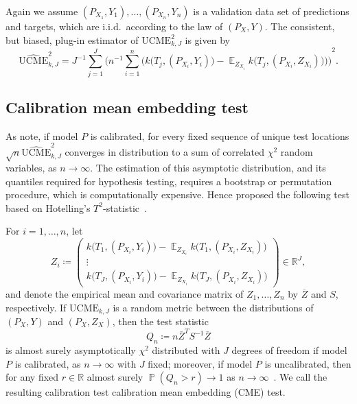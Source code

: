 \documentclass{article}
\DeclareMathOperator{\Prob}{\mathbb{P}}
\DeclareMathOperator{\Exp}{\mathbb{E}}
\begin{document}
Again we assume $(P_{X_1}, Y_1), \ldots, (P_{X_n}, Y_n)$ is a 
validation data set of predictions and targets, which are i.i.d.\
according to the law of $(P_X, Y)$. The consistent, but biased,
plug-in estimator of $\mathrm{UCME}^2_{k,J}$ is given by
\begin{equation*}
     \widehat{\mathrm{UCME}}^2_{k,J} = {J}^{-1} \sum_{j=1}^J {\Bigg(n^{-1} \sum_{i=1}^n \Big( k\big(T_j, (P_{X_i}, Y_i)\big) - \Exp_{Z_{X_i}} k\big(T_j, (P_{X_i}, Z_{X_i})\big)\Big) \Bigg)}^2.
\end{equation*}

\subsection{Calibration mean embedding test}

As \citet{Chwialkowski2015} note, if model $P$ is calibrated,
for every fixed sequence of unique test locations
$\sqrt{n} \widehat{\mathrm{UCME}}^2_{k,J}$ converges in distribution
to a sum of correlated $\chi^2$ random variables, as $n \to \infty$.
The estimation of this asymptotic distribution, and its quantiles
required for hypothesis testing, requires a bootstrap or permutation
procedure, which is computationally expensive. Hence
\citet{Chwialkowski2015} proposed the following test based on
Hotelling's $T^2$-statistic~\citep{Hotelling1931}.

For $i = 1, \ldots, n$, let
\begin{equation*}
    Z_i \coloneqq \begin{pmatrix} k\big(T_1, (P_{X_i}, Y_i)\big) - \Exp_{Z_{X_i}} k\big(T_1, (P_{X_i}, Z_{X_i})\big) \\ \vdots \\ k\big(T_J, (P_{X_i}, Y_i)\big) - \Exp_{Z_{X_i}} k\big(T_J, (P_{X_i}, Z_{X_i})\big) \end{pmatrix} \in \mathbb{R}^J,
\end{equation*}
and denote the empirical mean and covariance matrix of
$Z_1, \ldots, Z_n$ by $\overline{Z}$ and $S$, respectively.
If $\mathrm{UCME}_{k,J}$ is a random metric between the distributions
of $(P_X, Y)$ and $(P_X, Z_X)$, then the test statistic
\begin{equation*}
    Q_n \coloneqq n \overline{Z}^T S^{-1} \overline{Z}
\end{equation*}
is almost surely asymptotically $\chi^2$ distributed with
$J$ degrees of freedom if model $P$ is calibrated, as
$n \to \infty$ with $J$
fixed; moreover, if model $P$ is uncalibrated, then for
any fixed $r \in \mathbb{R}$ almost surely $\Prob(Q_n > r) \to 1$ as $n \to \infty$~\citep[Proposition~2]{Chwialkowski2015}.
We call the resulting calibration test calibration mean
embedding (CME) test.
\end{document}
